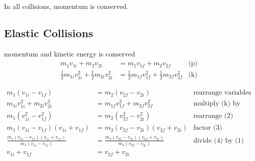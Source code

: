 \documentclass{article}
\theoremstyle{mytheoremstyle}
\theoremstyle{mytheoremstyle}
\theoremstyle{myproblemstyle}
\begin{document}
    In all collisions, momentum is conserved.

    \subsection*{Elastic Collisions}
    momentum and kinetic energy is conserved
    \begin{align*}
        m_1v_{1i} + m_2v_{2i} &= m_1v_{1f} + m_2v_{2f} & \text{(p)} \\
        \frac{1}{2} m_{1i}v_{1i}^2 + \frac{1}{2} m_{2i}v_{2i}^2 &= \frac{1}{2}
        m_{1f}v_{1f}^2 + \frac{1}{2} m_{2f}v_{2f}^2 & \text{(k)}
    \end{align*}

    \begin{align}
        m_1(v_{1i}-v_{1f}) &= m_2(v_{2f}-v_{2i}) & \text{rearrange variables in (p)}\\
        m_{1i}v_{1i}^2 + m_{2i}v_{2i}^2 &= m_{1f}v_{1f}^2 + m_{2f}v_{2f}^2 & \text{multiply (k) by two}\\
        m_1(v_{1i}^2 - v_{1f}^2) &= m_2(v_{2f}^2-v_{2i}^2) & \text{rearrange (2)}\\
        m_1(v_{1i}-v_{1f})(v_{1i}+v_{1f}) &= m_2(v_{2f}-v_{2i})(v_{2f}+v_{2i}) &\text{factor (3)}\\
        \frac{m_1(v_{1i}-v_{1f})(v_{1i}+v_{1f})}{
            m_1(v_{1i} - v_{1f})
        } &= \frac{m_2(v_{2f}-v_{2i})(v_{2f}+v_{2i})} {
            m_2(v_{2f}-v_{2i})
        } & \text{divide (4) by (1)} \\
        v_{1i} + v_{1f}  &= v_{2f} + v_{2i}
    \end{align}
\end{document}

